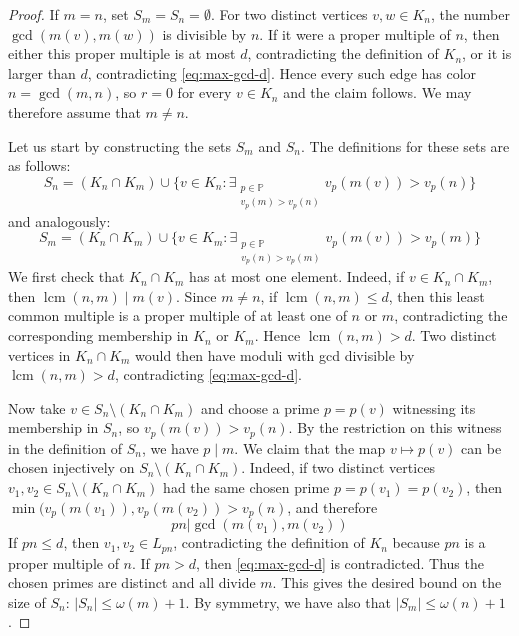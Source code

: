 \documentclass[11pt]{amsart}
\theoremstyle{remark}
\newcommand{\PP}{\mathbb{P}}
\begin{document}
\begin{proof}
  If $m=n$, set $S_m=S_n=\emptyset$. For two distinct vertices $v,w\in K_n$, the number $\gcd(m(v),m(w))$ is divisible by $n$. If it were a proper multiple of $n$, then either this proper multiple is at most $d$, contradicting the definition of $K_n$, or it is larger than $d$, contradicting \eqref{eq:max-gcd-d}. Hence every such edge has color $n=\gcd(m,n)$, so $r=0$ for every $v\in K_n$ and the claim follows. We may therefore assume that $m\neq n$.

  Let us start by constructing the sets $S_m$ and $S_n$. The definitions for these sets are as follows:
  \begin{equation}
    S_n = (K_n \cap K_m) \cup \{ v \in K_n : \exists_{\substack{p \in \PP \\ v_p(m) > v_p(n)}} v_p(m(v)) > v_p(n) \}
  \end{equation}
  and analogously:
  \begin{equation}
    S_m = (K_n \cap K_m) \cup \{ v \in K_m : \exists_{\substack{p \in \PP \\ v_p(n) > v_p(m)}} v_p(m(v)) > v_p(m) \}
  \end{equation}
  We first check that $K_n\cap K_m$ has at most one element. Indeed, if $v\in K_n\cap K_m$, then $\operatorname{lcm}(n,m)\mid m(v)$. Since $m\neq n$, if $\operatorname{lcm}(n,m)\le d$, then this least common multiple is a proper multiple of at least one of $n$ or $m$, contradicting the corresponding membership in $K_n$ or $K_m$. Hence $\operatorname{lcm}(n,m)>d$. Two distinct vertices in $K_n\cap K_m$ would then have moduli with gcd divisible by $\operatorname{lcm}(n,m)>d$, contradicting \eqref{eq:max-gcd-d}.

  Now take $v\in S_n\setminus (K_n\cap K_m)$ and choose a prime $p=p(v)$ witnessing its membership in $S_n$, so $v_p(m(v))>v_p(n)$. By the restriction on this witness in the definition of $S_n$, we have $p\mid m$. We claim that the map $v\mapsto p(v)$ can be chosen injectively on $S_n\setminus (K_n\cap K_m)$. Indeed, if two distinct vertices $v_1, v_2 \in S_n\setminus (K_n\cap K_m)$ had the same chosen prime $p=p(v_1)=p(v_2)$, then $\min( v_p(m(v_1)), v_p(m(v_2)) > v_p(n)$, and therefore
  \begin{equation}
    pn | \gcd(m(v_1), m(v_2)) 
  \end{equation}
  If $pn\le d$, then $v_1,v_2\in L_{pn}$, contradicting the definition of $K_n$ because $pn$ is a proper multiple of $n$. If $pn>d$, then \eqref{eq:max-gcd-d} is contradicted. Thus the chosen primes are distinct and all divide $m$. This gives the desired bound on the size of $S_n$: $|S_n| \leq \omega(m) + 1$. By symmetry, we have also that $|S_m| \leq \omega(n) + 1$. 


\end{proof}
\end{document}
